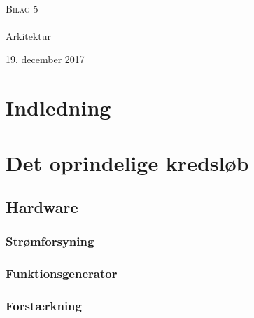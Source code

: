 \documentclass[main.tex]{subfiles}
\begin{document}
\begin{titlingpage}
\begin{center}

~ \\[3cm]


\textsc{\LARGE Bilag 5}\\[1.5cm]


\noindent\makebox[\linewidth]{\rule{\textwidth}{0.4pt}}\\
[0.5cm]{\Huge Arkitektur}
\noindent\makebox[\linewidth]{\rule{\textwidth}{0.4pt}}
\end{center}
\vfill
\begin{center}
{\large 19. december 2017}
\end{center}
\end{titlingpage}

\newpage
\tableofcontents*
\newpage

\chapter{Indledning}



\chapter{Det oprindelige kredsløb}
\section{Hardware}

\subsection{Strømforsyning}



\subsection{Funktionsgenerator}




\subsection{Forstærkning}
\end{document}
